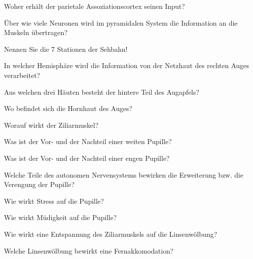 \documentclass[10pt, a4paper]{exam}
\begin{document}
\begin{questions}
  \begin{solution}
  \end{solution}
  \question Woher erhält der parietale Assoziationscortex seinen Input?
  \begin{solution}
  \end{solution}
  \question Über wie viele Neuronen wird im pyramidalen System die Information an die Muskeln übertragen?
  \begin{solution}
  \end{solution}
  \question Nennen Sie die 7 Stationen der Sehbahn!
  \begin{solution}
  \end{solution}
  \question In welcher Hemisphäre wird die Information von der Netzhaut des rechten Auges verarbeitet?
  \begin{solution}
  \end{solution}
  \question Aus welchen drei Häuten besteht der hintere Teil des Augapfels?
  \begin{solution}
  \end{solution}
  \question Wo befindet sich die Hornhaut des Auges?
  \begin{solution}
  \end{solution}
  \question Worauf wirkt der Ziliarmuskel?
  \begin{solution}
  \end{solution}
  \question Was ist der Vor- und der Nachteil einer weiten Pupille?
  \begin{solution}
  \end{solution}
  \question Was ist der Vor- und der Nachteil einer engen Pupille?
  \begin{solution}
  \end{solution}
  \question Welche Teile des autonomen Nervensystems bewirken die Erweiterung bzw. die Verengung der Pupille?
  \begin{solution}
  \end{solution}
  \question Wie wirkt Stress auf die Pupille?
  \begin{solution}
  \end{solution}
  \question Wie wirkt Müdigkeit auf die Pupille?
  \begin{solution}
  \end{solution}
  \question Wie wirkt eine Entspannung des Ziliarmuskels auf die Linsenwölbung?
  \begin{solution}
  \end{solution}
  \question Welche Linsenwölbung bewirkt eine Fernakkomodation?

\end{questions}
\end{document}
